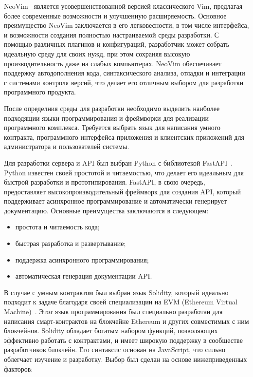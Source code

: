 NeoVim~\cite{bib:neovim} является усовершенствованной версией классического Vim, предлагая более современные возможности и улучшенную расширяемость. Основное преимущество NeoVim заключается в его легковесности, в том числе интерфейса, и возможности создания полностью настраиваемой среды разработки. С помощью различных плагинов и конфигураций, разработчик может собрать идеальную среду для своих нужд, при этом сохраняя высокую производительность даже на слабых компьютерах. NeoVim обеспечивает поддержку автодополнения кода, синтаксического анализа, отладки и интеграции с системами контроля версий, что делает его отличным выбором для разработки программного продукта.

После определния среды для разработки необходимо выделить наиболее подходящии языки программирования и фреймворки для реализации программного комплекса. Требуется выбрать язык для написания умного контракта, программного интерфейса приложения и клиентских приложений для администратора и пользователей системы.

Для разработки сервера и API был выбран Python с библиотекой FastAPI~\cite{bib:fastapi}. Python известен своей простотой и читаемостью, что делает его идеальным для быстрой разработки и прототипирования. FastAPI, в свою очередь, предоставляет высокопроизводительный фреймворк для создания API, который поддерживает асинхронное программирование и автоматически генерирует документацию. Основные преимущества заключаются в следующем:

\begin{itemize}
    \item простота и читаемость кода;
    \item быстрая разработка и развертывание;
    \item поддержка асинхронного программирования;
    \item автоматическая генерация документации API.
\end{itemize}

В случае с умным контрактом был выбран язык Solidity, который идеально подходит к задаче благодаря своей специализации на EVM (Ethereum Virtual Machine)~\cite{bib:evm}. Этот язык программирования был специально разработан для написания смарт-контрактов на блокчейне Ethereum и других совместимых с ним блокчейнов. Solidity обладает богатым набором функций, позволяющих эффективно работать с контрактами, и имеет широкую поддержку в сообществе разработчиков блокчейн. Его синтаксис основан на JavaScript, что сильно облегчает изучение и разработку. Выбор был сделан на основе нижеприведенных факторов:

